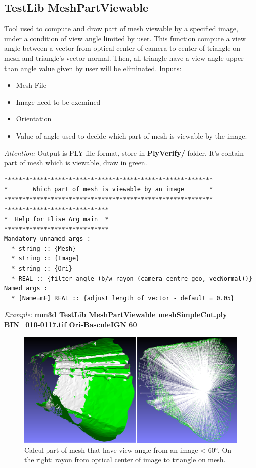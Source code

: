 \subsection{TestLib MeshPartViewable}
Tool used to compute and draw part of mesh viewable by a specified image, under a condition of view angle limited by user. This function compute a view angle between a vector from optical center of camera to center of triangle on mesh and triangle's vector normal. Then, all triangle have a view angle upper than angle value given by user will be eliminated.
Inputs:
\begin{itemize}
\item Mesh File
\item Image need to be exemined
\item Orientation
\item Value of angle used to decide which part of mesh is viewable by the image.
\end{itemize}
\textit{Attention:} Output is PLY file format, store in \textbf{PlyVerify/} folder. It's contain part of mesh which is viewable, draw in green.

\begin{verbatim}
**********************************************************
*       Which part of mesh is viewable by an image       *
**********************************************************
*****************************
*  Help for Elise Arg main  *
*****************************
Mandatory unnamed args : 
  * string :: {Mesh}
  * string :: {Image}
  * string :: {Ori}
  * REAL :: {filter angle (b/w rayon (camera-centre_geo, vecNormal))}
Named args : 
  * [Name=mF] REAL :: {adjust length of vector - default = 0.05}

\end{verbatim}

\textit{Example:}
\textbf{mm3d TestLib MeshPartViewable meshSimpleCut.ply BIN\_010-0117.tif Ori-BasculeIGN 60}

\begin{figure}[H]
\centering
\includegraphics[width=15cm]{FIGS/MeshProjOnImg/MeshViewable.png}
\caption{Calcul part of mesh that have view angle from an image < 60°. On the right: rayon from optical center of image to triangle on mesh.}
\label{SurfCorr}
\end{figure}

